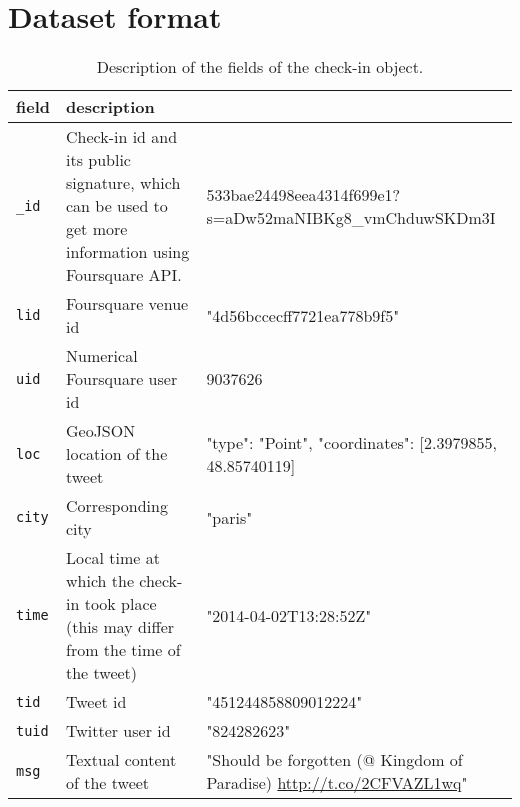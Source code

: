 \clearpage
{}
\chapter{Dataset format}
\label{chap:appendix}

\begin{table}[ht]
    \centering
    \begin{tabularx}{\textwidth}{lXX}
        \toprule
        field & description \\
        \midrule
        \texttt{\_id} & Check-in id and its public signature, which can be
used to get more information using Foursquare API. &
533bae24498eea4314f699e1?s=aDw52maNIBKg8\_vmChduwSKDm3I \\
        \texttt{lid} & Foursquare venue id & "4d56bccecff7721ea778b9f5"\\
        \texttt{uid} & Numerical Foursquare user id & 9037626\\
        \texttt{loc} & GeoJSON location of the tweet & {"type": "Point", "coordinates": [2.3979855, 48.85740119]}\\
        \texttt{city} & Corresponding city & "paris"\\
        \texttt{time} & Local time at which the check-in took place (this may
differ from the time of the tweet) & "2014-04-02T13:28:52Z"\\
        \texttt{tid} & Tweet id & "451244858809012224"\\
        \texttt{tuid} & Twitter user id & "824282623"\\
        \texttt{msg} & Textual content of the tweet & "Should be forgotten (@
Kingdom of Paradise) \url{http://t.co/2CFVAZL1wq}"\\
        \bottomrule
    \end{tabularx}
    \caption[Check-in format]{Description of the fields of the check-in
    object.\label{tab:checkinfields}}
\end{table}


